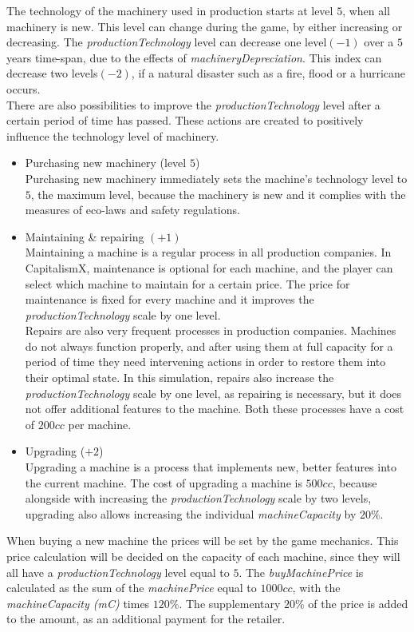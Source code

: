 The technology of the machinery used in production starts at level $5$, when all machinery is new. This level can change during the game, by either increasing or decreasing. The \textit{productionTechnology} level can decrease one level$(-1)$ over a $5$ years time-span, due to the effects of \textit{machineryDepreciation}. This index can decrease two levels$(-2)$, if a natural disaster such as a fire, flood or a hurricane occurs.\\
There are also possibilities to improve the \textit{productionTechnology} level after a certain period of time has passed. These actions are created to  positively influence the technology level of machinery.
\begin{itemize}
    \item Purchasing new machinery (level $5$) \\
Purchasing new machinery immediately sets the machine's technology level to $5$, the maximum level, because the machinery is new and it complies with the measures of eco-laws and safety regulations.
\item Maintaining \& repairing $(+1)$ \\
Maintaining a machine is a regular process in all production companies. In CapitalismX, maintenance is optional for each machine, and the player can select which machine to maintain for a certain price. The price for maintenance is fixed for every machine and it improves the \textit{productionTechnology} scale by one level. \\
Repairs are also very frequent processes in production companies. Machines do not always function properly, and after using them at full capacity for a period of time they need intervening actions in order to restore them into their optimal state. In this simulation, repairs also increase the \textit{productionTechnology} scale by one level, as repairing is necessary, but it does not offer additional features to the machine. Both these processes have a cost of $200cc$ per machine.

\item Upgrading ($+2$) \\
Upgrading a machine is a process that implements new, better features into the current machine.
The cost of upgrading a machine is $500cc$, because alongside with increasing the \textit{productionTechnology} scale by two levels, upgrading also allows increasing the individual \textit{machineCapacity} by $20\%$. 
\end{itemize}
When buying a new machine the prices will be set by the game mechanics. This price calculation will be decided on the capacity of each machine, since they will all have a \textit{productionTechnology} level equal to $5$. The \textit{buyMachinePrice} is calculated as the sum of the \textit{machinePrice} equal to $1000cc$, with the \textit{machineCapacity (mC)} times $120\%$.  The supplementary $20\%$ of the price is added to the amount, as an additional payment for the retailer.

